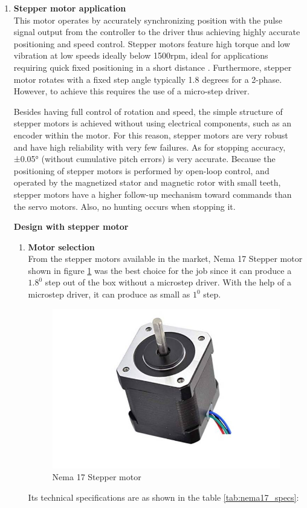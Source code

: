 \begin{enumerate}
    \item \textbf{Stepper motor application}\\
    This motor operates by accurately synchronizing position with the pulse signal output from the controller to the driver thus achieving highly accurate positioning and speed control. Stepper motors feature high torque and low vibration at low speeds ideally below 1500rpm, ideal for applications requiring quick fixed positioning in a short distance \cite{wargula2017investigations}. Furthermore, stepper motor rotates with a fixed step angle typically 1.8 degrees for a 2-phase. However, to achieve this requires the use of a micro-step driver.
    \par
    Besides having full control of rotation and speed, the simple structure of stepper motors is achieved without using electrical components, such as an encoder within the motor. For this reason, stepper motors are very robust and have high reliability with very few failures. As for stopping accuracy, ±0.05° (without cumulative pitch errors) is very accurate\cite{wargula2017investigations}. Because the positioning of stepper motors is performed by open-loop control, and operated by the magnetized stator and magnetic rotor with small teeth, stepper motors have a higher follow-up mechanism toward commands than the servo motors. Also, no hunting occurs when stopping it.
    
    \textbf{Design with stepper motor}
    \begin{enumerate}
    \item \textbf{Motor selection}\\
    From the stepper motors available in the market, Nema 17 Stepper motor shown in figure \ref{fig:Nema17 Steppper motor} was the best choice for the job since it can produce a $1.8^0$ step out of the box without a microstep driver. With the help of a microstep driver, it can produce as small as $1^0$ step.
    \begin{figure}[H]
        \centering
        \includegraphics[width=.3\textwidth, height=.2\textheight]{Figures/Nema17Stepper.jpg}
        \caption[Nema 17 Stepper motor]{Nema 17 Stepper motor \cite{nema17}}
        \label{fig:Nema17 Steppper motor}
    \end{figure}
    \par
    Its technical specifications are as shown in the table \ref{tab:nema17_specs}:


\end{enumerate}
\end{enumerate}
